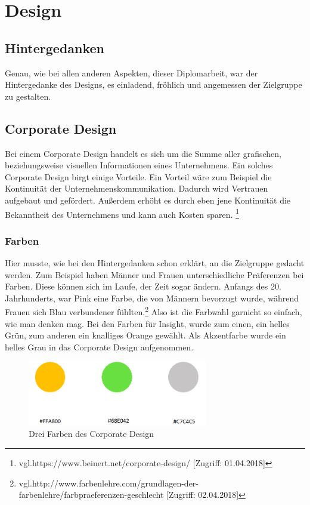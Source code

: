 \chapter{Design}
\renewcommand{\kapitelautor}{Autor: Niklas Kienreich}

\section{Hintergedanken}
Genau, wie bei allen anderen Aspekten, dieser Diplomarbeit, war der Hintergedanke des Designs, es einladend, fröhlich und angemessen der Zielgruppe zu gestalten.

\section{Corporate Design}
Bei einem Corporate Design handelt es sich um die Summe aller grafischen, beziehungsweise visuellen Informationen eines Unternehmens. Ein solches Corporate Design birgt einige Vorteile.
Ein Vorteil wäre zum Beispiel die Kontinuität der Unternehmenskommunikation. Dadurch wird Vertrauen aufgebaut und gefördert. Außerdem erhöht es durch eben jene Kontinuität die Bekanntheit des Unternehmens und kann auch Kosten sparen. \footnote{\label{} vgl.https://www.beinert.net/corporate-design/ [Zugriff: 01.04.2018]}
\subsection{Farben}
Hier musste, wie bei den Hintergedanken schon erklärt, an die Zielgruppe gedacht werden. Zum Beispiel haben Männer und Frauen unterschiedliche Präferenzen bei Farben. Diese können sich im Laufe, der Zeit sogar ändern. Anfangs des 20. Jahrhunderts, war Pink eine Farbe, die von Männern bevorzugt wurde, während Frauen sich Blau verbundener fühlten.\footnote{\label{} vgl.http://www.farbenlehre.com/grundlagen-der-farbenlehre/farbpraeferenzen-geschlecht [Zugriff: 02.04.2018]} Also ist die Farbwahl garnicht so einfach, wie man denken mag. Bei den Farben für Insight, wurde zum einen, ein helles Grün, zum anderen ein knalliges Orange gewählt. Als Akzentfarbe wurde ein helles Grau in das Corporate Design aufgenommen.

\begin{figure}[H] 
  \centering
     \includegraphics[width=0.7\textwidth]{design_abb1.png}
  \caption{Drei Farben des Corporate Design}
\end{figure}

